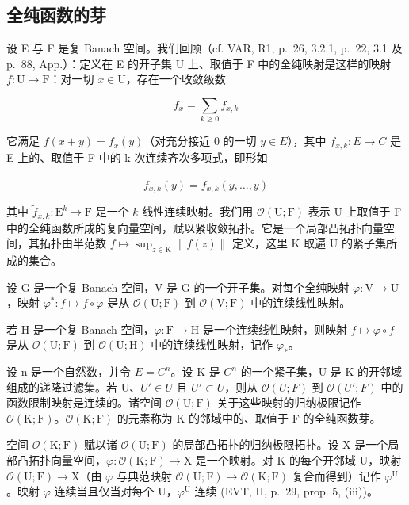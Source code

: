 \subsection{全纯函数的芽}

设 E 与 F 是复 Banach 空间。我们回顾（cf. VAR, R1, p.~26, 3.2.1, p.~22, 3.1 及 p.~88, App.）：定义在 E 的开子集 U 上、取值于 F 中的全纯映射是这样的映射 \(f \colon \mathrm{U} \to \mathrm{F}\)：对一切 \(x \in \mathrm{U}\)，存在一个收敛级数

\[
f _ {x} = \sum_ {k \geqslant 0} f _ {x, k}
\]

它满足 \(f(x + y) = f_x(y)\)（对充分接近 0 的一切 \(y \in E\)），其中 \(f_{x,k} \colon E \to C\) 是 E 上的、取值于 F 中的 k 次连续齐次多项式，即形如

\[
f _ {x, k} (y) = \widetilde {f} _ {x, k} (y, \ldots , y)
\]

其中 \(\widetilde{f}_{x,k}\colon\mathrm{E}^{k}\to\mathrm{F}\) 是一个 \(k\) 线性连续映射。我们用 \(\mathcal{O}(\mathrm{U};\mathrm{F})\) 表示 U 上取值于 F 中的全纯函数所成的复向量空间，赋以紧收敛拓扑。它是一个局部凸拓扑向量空间，其拓扑由半范数 \(f\mapsto\sup_{z\in\mathrm{K}}\|f(z)\|\) 定义，这里 K 取遍 U 的紧子集所成的集合。

设 G 是一个复 Banach 空间，V 是 G 的一个开子集。对每个全纯映射 \(\varphi\colon\mathrm{V}\to\mathrm{U}\)，映射 \(\varphi^{*}\colon f\mapsto f\circ\varphi\) 是从 \(\mathcal{O}(\mathrm{U};\mathrm{F})\) 到 \(\mathcal{O}(\mathrm{V};\mathrm{F})\) 中的连续线性映射。

若 H 是一个复 Banach 空间，\(\varphi\colon\mathrm{F}\to\mathrm{H}\) 是一个连续线性映射，则映射 \(f\mapsto\varphi\circ f\) 是从 \(\mathcal{O}(\mathrm{U};\mathrm{F})\) 到 \(\mathcal{O}(\mathrm{U};\mathrm{H})\) 中的连续线性映射，记作 \(\varphi_{*}\)。

设 n 是一个自然数，并令 \(E = C^{n}\)。设 K 是 \(C^{n}\) 的一个紧子集，U 是 K 的开邻域组成的递降过滤集。若 U、\(U' \in U\) 且 \(U' \subset U\)，则从 \(\mathcal{O}(U; F)\) 到 \(\mathcal{O}(U'; F)\) 中的函数限制映射是连续的。诸空间 \(\mathcal{O}(\mathrm{U};\mathrm{F})\) 关于这些映射的归纳极限记作 \(\mathcal{O}(\mathrm{K};\mathrm{F})\)。\(\mathcal{O}(\mathrm{K};\mathrm{F})\) 的元素称为 K 的邻域中的、取值于 F 的全纯函数芽。

空间 \(\mathcal{O}(\mathrm{K};\mathrm{F})\) 赋以诸 \(\mathcal{O}(\mathrm{U};\mathrm{F})\) 的局部凸拓扑的归纳极限拓扑。设 X 是一个局部凸拓扑向量空间，\(\varphi\colon\mathcal{O}(\mathrm{K};\mathrm{F})\to\mathrm{X}\) 是一个映射。对 K 的每个开邻域 U，映射 \(\mathcal{O}(\mathrm{U};\mathrm{F})\to\mathrm{X}\)（由 \(\varphi\) 与典范映射 \(\mathcal{O}(\mathrm{U};\mathrm{F})\to\mathcal{O}(\mathrm{K};\mathrm{F})\) 复合而得到）记作 \(\varphi^{\mathrm{U}}\)。映射 \(\varphi\) 连续当且仅当对每个 U，\(\varphi^{\mathrm{U}}\) 连续 (EVT, II, p.~29, prop. 5, (iii))。

